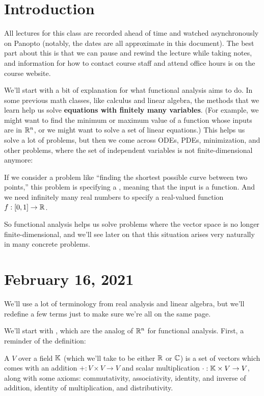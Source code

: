 \section*{Introduction}

\begin{fact}
All lectures for this class are recorded ahead of time and watched asynchronously on Panopto (notably, the dates are all approximate in this document). The best part about this is that we can pause and rewind the lecture while taking notes, and information for how to contact course staff and attend office hours is on the course website.
\end{fact}

We'll start with a bit of explanation for what functional analysis aims to do. In some previous math classes, like calculus and linear algebra, the methods that we learn help us solve \textbf{equations with finitely many variables}. (For example, we might want to find the minimum or maximum value of a function whose inputs are in $\mathbb R^n$, or we might want to solve a set of linear equations.) This helps us solve a lot of problems, but then we come across ODEs, PDEs, minimization, and other problems, where the set of independent variables is not finite-dimensional anymore:

\begin{example}
If we consider a problem like ``finding the shortest possible curve between two points,'' this problem is specifying a , meaning that the input is a function. And we need infinitely many real numbers to specify a real-valued function $f: [0, 1] \to \mathbb R$.
\end{example}

So functional analysis helps us solve problems where the vector space is no longer finite-dimensional, and we'll see later on that this situation arises very naturally in many concrete problems.

\section*{February 16, 2021}

We'll use a lot of terminology from real analysis and linear algebra, but we'll redefine a few terms just to make sure we're all on the same page.

We'll start with , which are the analog of $\mathbb R^n$ for functional analysis. First, a reminder of the definition:

\begin{definition}
A  $V$ over a field $\mathbb K$ (which we'll take to be either $\mathbb R$ or $\mathbb C$) is a set of vectors which comes with an addition $+: V \times V \to V$ and scalar multiplication $\cdot: \mathbb K \times V \to V$, along with some axioms: commutativity, associativity, identity, and inverse of addition, identity of multiplication, and distributivity.
\end{definition}

